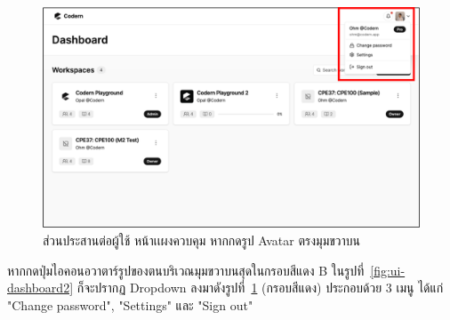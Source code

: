 \documentclass[12pt,one side,openright,a4paper]{cpe-thesis-th}
\newcommand{\thaijustify}[1]{%
  \par\hspace{30pt}\justifying
  #1
}
\begin{document}
\hypertarget{ui-dashboard5}{
  \begin{figure}[H]
    \centering
    \includegraphics[width=15cm]{figure/ui/ui-dashboard5.png}
    \caption[ส่วนประสานต่อผู้ใช้ หน้าเเผงควบคุม (กดตรงรูป Avatar)]{ ส่วนประสานต่อผู้ใช้ หน้าเเผงควบคุม หากกดรูป Avatar ตรงมุมขวาบน}
    \label{fig:ui-dashboard5}
  \end{figure}
}

\thaijustify{
  หากกดปุ่มไอคอนอวาตาร์รูปของตนบริเวณมุมขวาบนสุดในกรอบสีแดง B ในรูปที่~\ref{fig:ui-dashboard2} ก็จะปรากฏ Dropdown ลงมาดังรูปที่~\ref{fig:ui-dashboard5} (กรอบสีแดง) ประกอบด้วย 3 เมนู ได้แก่ "Change password", "Settings" และ "Sign out"

}
\end{document}
